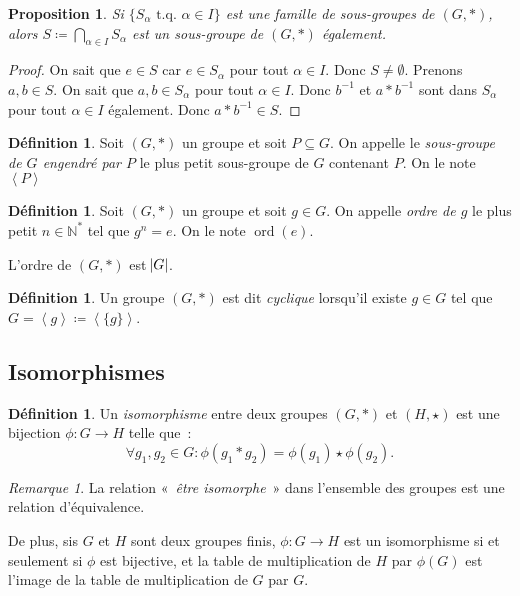 \documentclass{article}
\newtheorem{prp}[thm]{Proposition}
\theoremstyle{definition}
\newtheorem{déf}[thm]{Définition}
\theoremstyle{remark}
\newtheorem*{rmq}{Remarque}
\DeclareMathOperator{\ord}{ord}
\newcommand{\N}{\mathbb N}
\newcommand{\tq}{\text{ t.q. }}
\newcommand{\eng}[1]{\left\langle#1\right\rangle}
\begin{document}
		\begin{prp} Si $\{S_\alpha \tq \alpha \in I\}$ est une famille de sous-groupes de $(G, *)$, alors $S \coloneqq \bigcap_{\alpha \in I}S_\alpha$ est un
		sous-groupe de $(G, *)$ également.
		\end{prp}

		\begin{proof} On sait que $e \in S$ car $e \in S_\alpha$ pour tout $\alpha \in I$. Donc $S \neq \emptyset$. Prenons $a, b \in S$. On sait que
		$a, b \in S_\alpha$ pour tout $\alpha \in I$. Donc $b^{-1}$ et $a*b^{-1}$ sont dans $S_\alpha$ pour tout $\alpha \in I$ également. Donc $a*b^{-1} \in S$.
		\end{proof}

		\begin{déf} Soit $(G, *)$ un groupe et soit $P \subseteq G$. On appelle le \textit{sous-groupe de $G$ engendré par $P$} le plus petit sous-groupe de $G$
		contenant $P$. On le note $\eng P$
		\end{déf}

		\begin{déf} Soit $(G, *)$ un groupe et soit $g \in G$. On appelle \textit{ordre de $g$} le plus petit $n \in \N^*$ tel que $g^n = e$.
		On le note $\ord(e)$.

		L'ordre de $(G, *)$ est $\abs G$.
		\end{déf}

		\begin{déf} Un groupe $(G, *)$ est dit \textit{cyclique} lorsqu'il existe $g \in G$ tel que $G = \eng g \coloneqq \eng {\{g\}}$.
		\end{déf}

	\subsection{Isomorphismes}
		\begin{déf} Un \textit{isomorphisme} entre deux groupes $(G, *)$ et $(H, \star)$ est une bijection $\phi : G \to H$ telle que~:
		\[\forall g_1, g_2 \in G : \phi(g_1 * g_2) = \phi(g_1) \star \phi(g_2).\]
		\end{déf}

		\begin{rmq} La relation «~\textit{être isomorphe}~» dans l'ensemble des groupes est une relation d'équivalence.

		De plus, sis $G$ et $H$ sont deux groupes finis, $\phi : G \to H$ est un isomorphisme si et seulement si $\phi$ est bijective, et la table de
		multiplication de $H$ par $\phi(G)$ est l'image de la table de multiplication de $G$ par $G$.
		\end{rmq}
\end{document}

